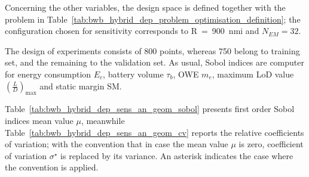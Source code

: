 Concerning the other variables, the design space is defined together with the problem in Table~\ref{tab:bwb_hybrid_dep_problem_optimisation_definition}; the configuration chosen for sensitivity corresponds to R~=~900~nmi and $N_{EM}=32$.  

The design of experiments consists of 800 points, whereas 750 belong to training set, and the remaining to the validation set. 
As usual, Sobol indices are computer for energy consumption $E_c$, battery volume $\tau_{b}$, OWE $m_e$, maximum LoD value $\left(\frac{L}{D}\right)_{\max}$ and static margin SM.

Table~\ref{tab:bwb_hybrid_dep_sens_an_geom_sobol} presents first order Sobol indices mean value $\mu$, meanwhile Table~\ref{tab:bwb_hybrid_dep_sens_an_geom_cv} reports the relative coefficients of variation; with the convention that in case the mean value $\mu$ is zero, coefficient of variation $\sigma^{\star}$ is replaced by its variance. 
An asterisk indicates the case where the convention is applied.
